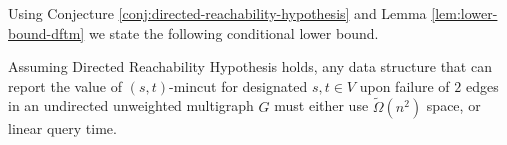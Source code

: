 Using Conjecture \ref{conj:directed-reachability-hypothesis} and Lemma \ref{lem:lower-bound-dftm} we state the following conditional lower bound.

\begin{theorem}
\label{th:lower-bound-dftm}
Assuming Directed Reachability Hypothesis holds, any data structure that can report the value of $(s,t)$-mincut for designated $s,t \in V$ upon failure of $2$ edges in an undirected unweighted multigraph $G$ must either use ${\tilde \Omega}(n^2)$ space, or linear query time.
\end{theorem}




